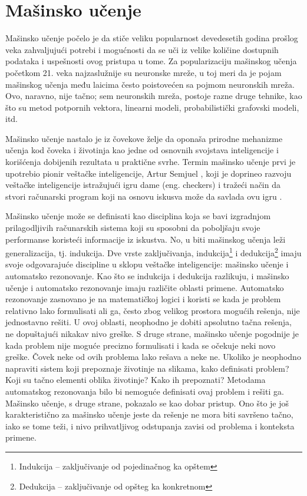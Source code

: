 \chapter{Mašinsko učenje}
\label{ch:ml}
Mašinsko učenje počelo je da stiče veliku popularnost devedesetih godina prošlog veka zahvaljujući potrebi i mogućnosti da se uči iz velike količine dostupnih podataka i uspešnosti ovog pristupa u tome. Za popularizaciju mašinskog učenja početkom 21. veka najzaslužnije su neuronske mreže, u toj meri da je pojam mašinskog učenja među laicima često poistovećen sa pojmom neuronskih mreža. Ovo, naravno, nije tačno; sem neuronskih mreža, postoje razne druge tehnike, kao što su metod potpornih vektora, linearni modeli, probabilistički grafovski modeli, itd. \par

Mašinsko učenje nastalo je iz čovekove želje da oponaša prirodne mehanizme učenja kod čoveka i životinja kao jedne od osnovnih svojstava inteligencije i korišćenja dobijenih rezultata u praktične svrhe. Termin mašinsko učenje prvi je upotrebio pionir veštačke inteligencije, Artur Semjuel \cite{samuel_ai}, koji je doprineo razvoju veštačke inteligencije istražujući igru dame (eng. checkers) i tražeći način da stvori računarski program koji na osnovu iskusva može da savlada ovu igru \cite{samuel}. 
\par

Mašinsko učenje može se definisati kao disciplina koja se bavi izgradnjom prilagodljivih računarskih sistema koji su sposobni da poboljšaju svoje performanse koristeći informacije iz iskustva.\cite{janicic_vi} No, u biti mašinskog učenja leži generalizacija, tj. indukcija. Dve vrste zaključivanja, indukcija\footnote{Indukcija -- zaključivanje od pojedinačnog ka opštem} i dedukcija\footnote{Dedukcija -- zaključivanje od opšteg ka konkretnom} imaju svoje odgovarajuće discipline u sklopu veštačke inteligencije: mašinsko učenje i automatsko rezonovanje. Kao što se indukcija i dedukcija razlikuju, i mašinsko učenje i automatsko rezonovanje imaju različite oblasti primene. Automatsko rezonovanje zasnovano je na matematičkoj logici i koristi se kada je problem relativno lako formulisati ali ga, često zbog velikog prostora mogućih rešenja, nije jednostavno rešiti. U ovoj oblasti, neophodno je dobiti apsolutno tačna rešenja, ne dopuštajući nikakav nivo greške.
S druge strane, mašinsko učenje pogodnije je kada problem nije moguće precizno formulisati i kada se očekuje neki novo greške. Čovek neke od ovih problema lako rešava a neke ne. 
Ukoliko je neophodno napraviti sistem koji prepoznaje životinje na slikama, kako definisati problem? Koji su tačno elementi oblika životinje? Kako ih prepoznati?  Metodama automatskog rezonovanja bilo bi nemoguće definisati ovaj problem i rešiti ga. Mašinsko učenje, s druge strane, pokazalo se kao dobar pristup. Ono što je još karakteristično za mašinsko učenje jeste da rešenje ne mora biti savršeno tačno, iako se tome teži, i nivo prihvatljivog odstupanja zavisi od problema i konteksta primene. \par


